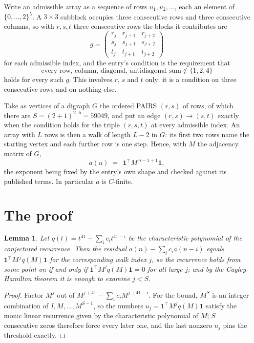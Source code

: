\documentclass[11pt,a4paper]{article}
\theoremstyle{plain}
\newtheorem{lemma}[theorem]{Lemma}
\theoremstyle{definition}
\begin{document}
Write an admissible array as a sequence of rows $u_1,u_2,\dots$, each an element of
$\{0,\dots,2\}^{5}$. A $3\times3$ subblock occupies three consecutive rows and
three consecutive columns, so with $r,s,t$ three consecutive rows the blocks it
contributes are
\[
g=\begin{pmatrix}r_j&r_{j+1}&r_{j+2}\\ s_j&s_{j+1}&s_{j+2}\\ t_j&t_{j+1}&t_{j+2}\end{pmatrix}
\]
for each admissible index, and the entry's condition is the requirement that
\[
\text{every row, column, diagonal, antidiagonal sum} \notin \{1,2,4\}
\]
holds for every such $g$. This involves $r$, $s$ and $t$ only: it is a condition on
three consecutive rows and on nothing else.

Take as vertices of a digraph $G$ the ordered PAIRS $(r,s)$ of rows, of which there are
$S=(2+1)^{2\cdot5}=59049$, and put an edge $(r,s)\to(s,t)$ exactly when the condition
holds for the triple $(r,s,t)$ at every admissible index. An array with $L$ rows is then a
walk of length $L-2$ in $G$: its first two rows name the starting vertex and each further
row is one step. Hence, with $M$ the adjacency matrix of $G$,
\[
a(n)\;=\;\,\mathbf{1}^{\!\top}M^{\,n-1+1}\mathbf{1},
\]
the exponent being fixed by the entry's own shape and checked against its published terms.
In particular $a$ is $C$-finite.

\section{The proof}

\begin{lemma}\label{lem:crit}
Let $q(t)=t^{41}-\sum_i c_it^{41-i}$ be the characteristic polynomial of the
conjectured recurrence. Then the residual $a(n)-\sum_ic_ia(n-i)$ equals
$\mathbf{1}^{\!\top}M^{\,j}q(M)\mathbf{1}$ for the corresponding walk index
$j$, so the recurrence holds from some point on if and only if
$\mathbf{1}^{\!\top}M^{j}q(M)\mathbf{1}=0$ for all large $j$; and by the
Cayley--Hamilton theorem it is enough to examine $j<S$.
\end{lemma}

\begin{proof}
Factor $M^{j}$ out of $M^{j+41}-\sum_ic_iM^{j+41-i}$. For the bound, $M^{S}$
is an integer combination of $I,M,\dots,M^{S-1}$, so the numbers
$u_j=\mathbf{1}^{\!\top}M^{j}q(M)\mathbf{1}$ satisfy the monic linear recurrence given by
the characteristic polynomial of $M$; $S$ consecutive zeros therefore force every later one,
and the last nonzero $u_j$ pins the threshold exactly.
\end{proof}
\end{document}
